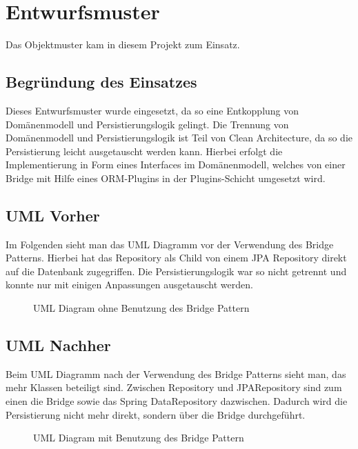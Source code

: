 
\chapter{Entwurfsmuster}
Das Objektmuster  kam in diesem Projekt zum Einsatz. 

\section{Begründung des Einsatzes}
Dieses Entwurfsmuster wurde eingesetzt, da so eine Entkopplung von Domänenmodell und Persistierungslogik gelingt. Die Trennung von Domänenmodell und Persistierungslogik ist Teil von Clean Architecture, da so die Persistierung leicht ausgetauscht werden kann. Hierbei erfolgt die Implementierung in Form eines Interfaces im Domänenmodell, welches von einer Bridge mit Hilfe eines ORM-Plugins in der Plugins-Schicht umgesetzt wird.

\section{\ac{UML} Vorher}
Im Folgenden sieht man das \ac{UML} Diagramm vor der Verwendung des Bridge Patterns. Hierbei hat das Repository als Child von einem JPA Repository direkt auf die Datenbank zugegriffen. Die Persistierungslogik war so nicht getrennt und konnte nur mit einigen Anpassungen ausgetauscht werden.

        \begin{figure}[H]
	        \centering
	        \caption{UML Diagram ohne Benutzung des Bridge Pattern}
	        \label{a.2.cleanArchitecture}
        \end{figure}

\section{\ac{UML} Nachher}
Beim \ac{UML} Diagramm nach der Verwendung des Bridge Patterns sieht man, das mehr Klassen beteiligt sind. Zwischen Repository und JPARepository sind zum einen die Bridge sowie das Spring DataRepository dazwischen. Dadurch wird die Persistierung nicht mehr direkt, sondern über die Bridge durchgeführt.

        \begin{figure}[H]
	        \centering
	        \caption{UML Diagram mit Benutzung des Bridge Pattern}
	        \label{a.2.cleanArchitecture}
        \end{figure}